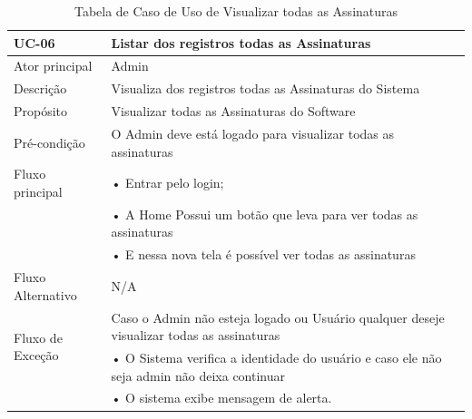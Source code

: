 \documentclass[a4paper,12pt]{article}
\begin{document}
\begin{table}[ht]
    \centering
    \begin{tabular}{|p{3.5cm}|p{10cm}|p{7cm}|}
        \hline
        \textbf{UC-06}                     & \textbf{ Listar dos registros todas as Assinaturas}                                        \\
        \hline

        \multirow{1}{*}{Ator principal}    & Admin                                                                                      \\
        \hline
        \multirow{1}{*}{Descrição}         & Visualiza dos registros todas as Assinaturas do Sistema                                    \\
        \hline

        \multirow{1}{*}{Propósito}         & Visualizar todas as Assinaturas do Software                                                \\
        \hline

        \multirow{1}{*}{Pré-condição}      & O Admin deve está logado para visualizar todas as assinaturas                              \\
        \hline

        \multirow{1}{*}{Fluxo principal}
                                           & • Entrar pelo login;                                                                       \\
                                           & • A Home Possui um botão que leva para ver todas as assinaturas                            \\
                                           & • E nessa nova tela é possível ver todas as assinaturas                                    \\
        \cline{2-2}
        \hline

        \multirow{1}{*}{Fluxo Alternativo} & N/A                                                                                        \\
        \hline

        \multirow{2}{*}{Fluxo de Exceção}
                                           & Caso o Admin não esteja logado ou Usuário qualquer deseje visualizar todas as  assinaturas \\
                                           & • O Sistema verifica a identidade do usuário e caso ele não seja admin não deixa continuar \\
                                           & • O sistema exibe mensagem de alerta.                                                      \\
        \hline
    \end{tabular}
    \caption{Tabela de Caso de Uso de Visualizar todas  as Assinaturas}
\end{table}
\end{document}
